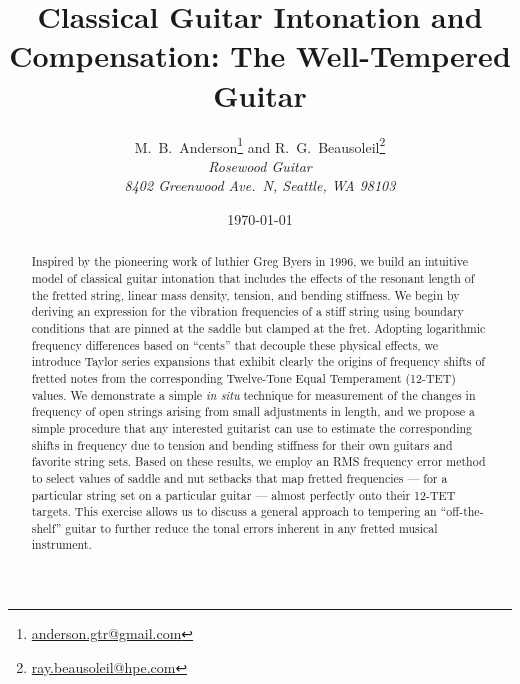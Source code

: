 \documentclass[12pt]{article}
\title{{\Huge\textbf{Classical Guitar Intonation and Compensation: The Well-Tempered Guitar}}}
\author{ M.\ B.\ Anderson\footnote{\href{mailto:anderson.gtr@gmail.com}{anderson.gtr@gmail.com}}\:  and R.\ G.\ Beausoleil\footnote{\href{mailto:ray.beausoleil@hpe.com}{ray.beausoleil@hpe.com}} \\
 \textit{Rosewood Guitar} \\
 \textit{8402 Greenwood Ave.\ N, Seattle, WA  98103}}
\date{\today}
\begin{document}
 \maketitle

 \begin{abstract}
Inspired by the pioneering work of luthier Greg Byers in 1996, we build an intuitive model of classical guitar intonation that includes the effects of the resonant length of the fretted string, linear mass density, tension, and bending stiffness. We begin by deriving an expression for the vibration frequencies of a stiff string using boundary conditions that are pinned at the saddle but clamped at the fret. Adopting logarithmic frequency differences based on ``cents'' that decouple these physical effects, we introduce Taylor series expansions that exhibit clearly the origins of frequency shifts of fretted notes from the corresponding Twelve-Tone Equal Temperament (12-TET) values. We demonstrate a simple \emph{in situ} technique for measurement of the changes in frequency of open strings arising from small adjustments in length, and we propose a simple procedure that any interested guitarist can use to estimate the corresponding shifts in frequency due to tension and bending stiffness for their own guitars and favorite string sets. Based on these results, we employ an RMS frequency error method to select values of saddle and nut setbacks that map fretted frequencies --- for a particular string set on a particular guitar --- almost perfectly onto their 12-TET targets. This exercise allows us to discuss a general approach to tempering an ``off-the-shelf'' guitar to further reduce the tonal errors inherent in any fretted musical instrument.
 \end{abstract}

 \tableofcontents

 
 
 
 
 
 

 \appendix
 
 
 
 


 
 

 
\end{document}
